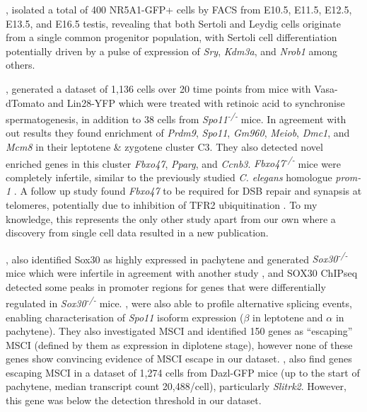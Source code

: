 \cite{Stevant2018Deciphering}, isolated a total of 400 NR5A1-GFP+ cells by FACS from E10.5, E11.5, E12.5, E13.5, and E16.5 testis, revealing that both Sertoli and Leydig cells originate from a single common progenitor population, with Sertoli cell differentiation potentially driven by a pulse of expression of \textit{Sry}, \textit{Kdm3a}, and \textit{Nrob1} among others.

\cite{Chen2018Singlecell}, generated a dataset of 1,136 cells over 20 time points from mice with Vasa-dTomato and Lin28-YFP which were treated with retinoic acid to synchronise spermatogenesis, in addition to 38 cells from \textit{Spo11\textsuperscript{-/-}} mice. In agreement with out results they found enrichment of \textit{Prdm9}, \textit{Spo11}, \textit{Gm960}, \textit{Meiob}, \textit{Dmc1}, and \textit{Mcm8} in their leptotene \& zygotene cluster C3. They also detected novel enriched genes in this cluster \textit{Fbxo47}, \textit{Pparg}, and \textit{Ccnb3}. \textit{Fbxo47\textsuperscript{-/-}} mice were completely infertile, similar to the previously studied \textit{C. elegans} homologue \textit{prom-1} \parencite{Jantsch2007Caenorhabditis}. A follow up study found \textit{Fbxo47} to be required for DSB repair and synapsis at telomeres, potentially due to inhibition of TFR2 ubiquitination \parencite{Hua2019FBXO47}. To my knowledge, this represents the only other study apart from our own where a discovery from single cell data resulted in a new publication.

\cite{Chen2018Singlecell}, also identified Sox30 as highly expressed in pachytene and generated \textit{Sox30\textsuperscript{-/-}} mice which were infertile in agreement with another study \parencite{Feng2017SOX30}, and SOX30 ChIPseq detected some peaks in promoter regions for genes that were differentially regulated in \textit{Sox30\textsuperscript{-/-}} mice. \cite{Chen2018Singlecell}, were also able to profile alternative splicing events, enabling characterisation of \textit{Spo11} isoform expression ($\beta$ in leptotene and $\alpha$ in pachytene). They also investigated MSCI and identified 150 genes as ``escaping'' MSCI (defined by them as expression in diplotene stage), however none of these genes show convincing evidence of MSCI escape in our dataset. \cite{Vertesy2019Dynamics}, also find genes escaping MSCI in a dataset of 1,274 cells from Dazl-GFP mice (up to the start of pachytene, median transcript count 20,488/cell), particularly \textit{Slitrk2}. However, this gene was below the detection threshold in our dataset.


